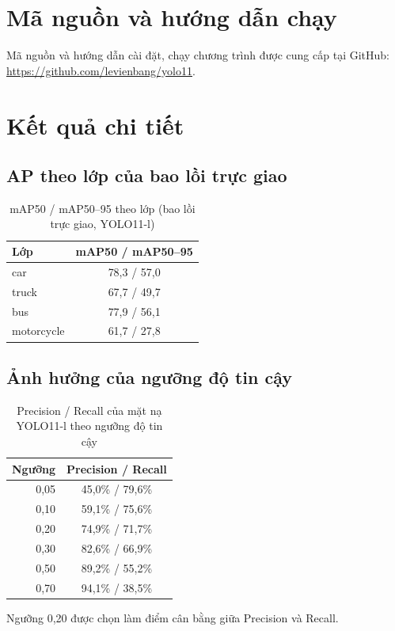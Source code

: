 \chapter{Mã nguồn và hướng dẫn chạy}
\label{app:run}

Mã nguồn và hướng dẫn cài đặt, chạy chương trình được cung cấp tại GitHub:
\url{https://github.com/levienbang/yolo11}.

\chapter{Kết quả chi tiết}
\label{app:results}

\section{AP theo lớp của bao lồi trực giao}

\begin{table}[H]
\centering
\caption{mAP50 / mAP50--95 theo lớp (bao lồi trực giao, YOLO11-l)}
\begin{tabular}{lc}
\toprule
Lớp & mAP50 / mAP50--95 \\
\midrule
car        & 78,3 / 57,0 \\
truck      & 67,7 / 49,7 \\
bus        & 77,9 / 56,1 \\
motorcycle & 61,7 / 27,8 \\
\bottomrule
\end{tabular}
\end{table}

\section{Ảnh hưởng của ngưỡng độ tin cậy}

\begin{table}[H]
\centering
\caption{Precision / Recall của mặt nạ YOLO11-l theo ngưỡng độ tin cậy}
\begin{tabular}{rc}
\toprule
Ngưỡng & Precision / Recall \\
\midrule
0,05 & 45,0\% / 79,6\% \\
0,10 & 59,1\% / 75,6\% \\
0,20 & 74,9\% / 71,7\% \\
0,30 & 82,6\% / 66,9\% \\
0,50 & 89,2\% / 55,2\% \\
0,70 & 94,1\% / 38,5\% \\
\bottomrule
\end{tabular}
\end{table}

Ngưỡng 0,20 được chọn làm điểm cân bằng giữa Precision và Recall.
